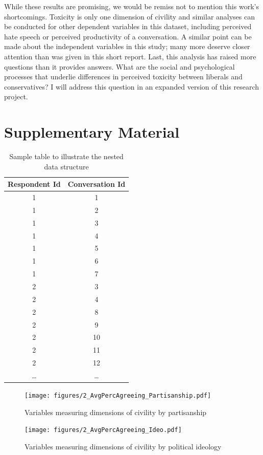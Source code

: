 \documentclass{article}
\begin{document}
While these results are promising, we would be remiss not to mention this work's shortcomings. Toxicity is only one dimension of civility and similar analyses can be conducted for other dependent variables in this dataset, including perceived hate speech or perceived productivity of a conversation. A similar point can be made about the independent variables in this study; many more deserve closer attention than was given in this short report. Last, this analysis has raised more questions than it provides answers. What are the social and psychological processes that underlie differences in perceived toxicity between liberals and conservatives? I will address this question in an expanded version of this research project. 

\newpage



\clearpage
\section{Supplementary Material}

\begin{table}[htbp]
    \centering
    \begin{tabular}{|c|c|}
    \hline
    \textbf{Respondent Id} & \textbf{Conversation Id} \\
    \hline
    1 & 1 \\
    1 & 2 \\
    1 & 3 \\
    1 & 4 \\
    1 & 5 \\
    1 & 6 \\
    1 & 7 \\
    \midrule
    2 & 3 \\
    2 & 4 \\
    2 & 8 \\
    2 & 9 \\
    2 & 10 \\
    2 & 11 \\
    2 & 12 \\
    \dots & \dots \\
    \hline
    \end{tabular}
    \caption{Sample table to illustrate the nested data structure}
    \label{sample-table}
\end{table}

\clearpage

\begin{figure}
    \centering
    \texttt{[image: figures/2\_AvgPercAgreeing\_Partisanship.pdf]}
    \caption{Variables measuring dimensions of civility by partisanship}
    \label{fig:civility-partisanship}
    \vspace{0.25cm}
    \texttt{[image: figures/2\_AvgPercAgreeing\_Ideo.pdf]}
    \caption{Variables measuring dimensions of civility by political ideology}
    \label{fig:civility-ideology}
\end{figure}
\end{document}
